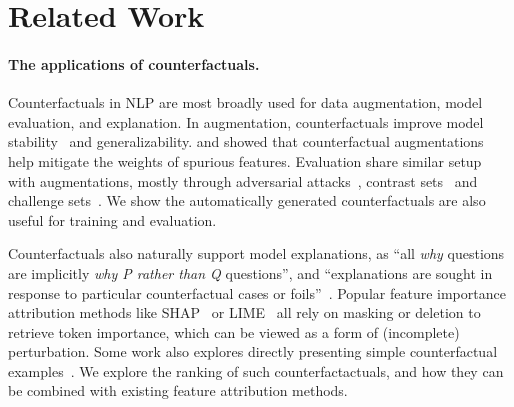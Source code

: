 \section{Related Work}
\label{sec:relate}

\paragraph{The applications of counterfactuals.}

Counterfactuals in NLP are most broadly used for data augmentation, model evaluation, and explanation.
In augmentation, counterfactuals improve model stability~\cite{Wu2019ConditionalBC, Wei2019EDAED, Kumar2020DataAU} and generalizability.
\citet{kaushik2019learning} and \citet{teney2020learning} showed that counterfactual augmentations help mitigate the weights of spurious features.
Evaluation share similar setup with augmentations, mostly through adversarial attacks~\cite{Song2020UniversalAA}, contrast sets~\cite{kaushik2019learning} and challenge sets~\cite{Geiger2019PosingFG, liu-etal-2019-inoculation}.
We show the automatically generated counterfactuals are also useful for training and evaluation.

Counterfactuals also naturally support model explanations, as ``all \emph{why} questions are implicitly \emph{why P rather than Q} questions'', and ``explanations are sought in response to particular counterfactual cases or foils''~\cite{miller}.
Popular feature importance attribution methods like SHAP~\cite{NIPS2017_7062} or LIME~\cite{Ribeiro2016WhySI} all rely on masking or deletion to retrieve token importance, which can be viewed as a form of (incomplete) perturbation.
Some work also explores directly presenting simple counterfactual examples~\cite{hase2020evaluating, vig2020causal, kang2020counterfactual}.
We explore the ranking of such counterfactactuals, and how they can be combined with existing feature attribution methods.

